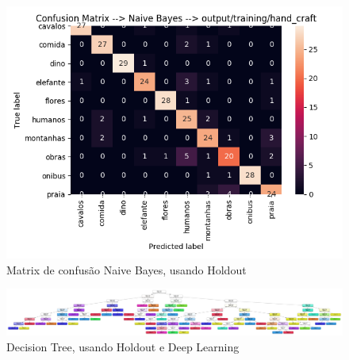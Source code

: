 \documentclass[
article,			%
11pt,				%
oneside,			%
a4paper,			%
english,			%
brazil,				%
sumario=tradicional,
]{abntex2}
\begin{document}
\begin{anexosenv}
		\begin{figure}[htb]
			\caption{\label{confusion-matrix-naive-holdout-hand-craft}Matrix de confusão Naive Bayes, usando Holdout}
			\begin{center}
				\includegraphics[scale=0.5]{confusion-matrix-naive-holdout-hand-craft.png}
			\end{center}
		\end{figure}
	
		\begin{figure}[htb]
			\caption{\label{decision-tree-holdout-deep}Decision Tree, usando Holdout e Deep Learning}
			\begin{center}
				\includegraphics[scale=0.06]{Decision_Tree_Deep.pdf}
			\end{center}
		\end{figure}
	

\end{anexosenv}
\end{document}
